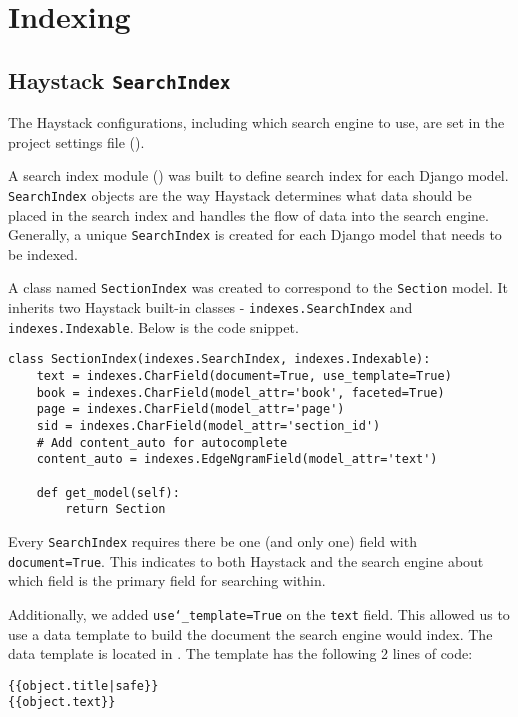 \section{Indexing}
\subsection{Haystack \texttt{SearchIndex}}
The Haystack configurations, including which search engine to use, are set in the project settings file (). 

A search index module () was built to define search index for each Django model. \texttt{SearchIndex} objects are the way Haystack determines what data should be placed in the search index and handles the flow of data into the search engine. Generally, a unique \texttt{SearchIndex} is created for each Django model that needs to be indexed. 

A class named \texttt{SectionIndex} was created to correspond to the \texttt{Section} model. It inherits two Haystack built-in classes - \texttt{indexes.SearchIndex} and \texttt{indexes.Indexable}. Below is the code snippet.

\begin{verbatim}
class SectionIndex(indexes.SearchIndex, indexes.Indexable):
    text = indexes.CharField(document=True, use_template=True)
    book = indexes.CharField(model_attr='book', faceted=True)
    page = indexes.CharField(model_attr='page')
    sid = indexes.CharField(model_attr='section_id')
    # Add content_auto for autocomplete
    content_auto = indexes.EdgeNgramField(model_attr='text')

    def get_model(self):
        return Section
\end{verbatim}

Every \texttt{SearchIndex} requires there be one (and only one) field with \texttt{document=True}. This indicates to both Haystack and the search engine about which field is the primary field for searching within.

Additionally, we added \texttt{use\char`_template=True} on the \texttt{text} field. This allowed us to use a data template to build the document the search engine would index. The data template is located in . The template has the following 2 lines of code:
\begin{verbatim}
{{object.title|safe}}
{{object.text}}
\end{verbatim}

